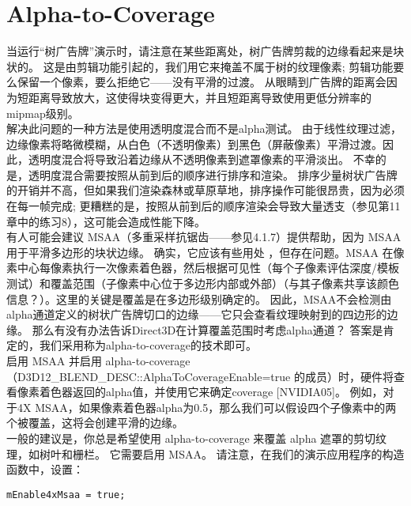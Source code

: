 \section{Alpha-to-Coverage}
\begin{flushleft}
当运行“树广告牌”演示时，请注意在某些距离处，树广告牌剪裁的边缘看起来是块状的。 这是由剪辑功能引起的，我们用它来掩盖不属于树的纹理像素; 剪辑功能要么保留一个像素，要么拒绝它——没有平滑的过渡。 从眼睛到广告牌的距离会因为短距离导致放大，这使得块变得更大，并且短距离导致使用更低分辨率的mipmap级别。\\

解决此问题的一种方法是使用透明度混合而不是alpha测试。 由于线性纹理过滤，边缘像素将略微模糊，从白色（不透明像素）到黑色（屏蔽像素）平滑过渡。因此，透明度混合将导致沿着边缘从不透明像素到遮罩像素的平滑淡出。 不幸的是，透明度混合需要按照从前到后的顺序进行排序和渲染。 排序少量树状广告牌的开销并不高，但如果我们渲染森林或草原草地，排序操作可能很昂贵，因为必须在每一帧完成; 更糟糕的是，按照从前到后的顺序渲染会导致大量透支（参见第11章中的练习8），这可能会造成性能下降。\\

有人可能会建议 MSAA（多重采样抗锯齿——参见4.1.7）提供帮助，因为 MSAA 用于平滑多边形的块状边缘。 确实，它应该有些用处 ，但存在问题。MSAA 在像素中心每像素执行一次像素着色器，然后根据可见性（每个子像素评估深度/模板测试）和覆盖范围（子像素中心位于多边形内部或外部）（与其子像素共享该颜色信息？）。这里的关键是覆盖是在多边形级别确定的。 因此，MSAA不会检测由alpha通道定义的树状广告牌切口的边缘——它只会查看纹理映射到的四边形的边缘。 那么有没有办法告诉Direct3D在计算覆盖范围时考虑alpha通道？ 答案是肯定的，我们采用称为alpha-to-coverage的技术即可。\\

启用 MSAA 并启用 alpha-to-coverage（D3D12\_BLEND\_DESC::AlphaToCoverageEnable=true 的成员）时，硬件将查看像素着色器返回的alpha值，并使用它来确定coverage [NVIDIA05]。 例如，对于4X MSAA，如果像素着色器alpha为0.5，那么我们可以假设四个子像素中的两个被覆盖，这将会创建平滑的边缘。\\

一般的建议是，你总是希望使用 alpha-to-coverage 来覆盖 alpha 遮罩的剪切纹理，如树叶和栅栏。 它需要启用 MSAA。 请注意，在我们的演示应用程序的构造函数中，设置：\\
\end{flushleft}

\begin{lstlisting}
mEnable4xMsaa = true;
\end{lstlisting}

